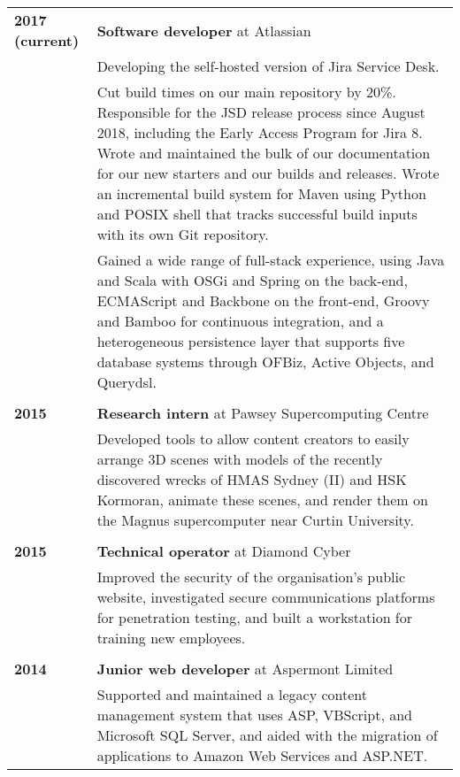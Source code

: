 \documentclass[a4paper,12pt]{article}
\begin{document}
\begin{tabular}{p{35mm}p{125mm}}
	                    \textbf{2017 (current)}     & \textbf{Software developer} at Atlassian
	\vspace{0.2em}  \\                              & Developing the self-hosted version of Jira Service Desk.
	\vspace{0.2em}  \\                              & Cut build times on our main repository by 20\%. Responsible for the JSD release process since August 2018, including the Early Access Program for Jira 8. Wrote and maintained the bulk of our documentation for our new starters and our builds and releases. Wrote an incremental build system for Maven using Python and POSIX shell that tracks successful build inputs with its own Git repository.
	\vspace{0.2em}  \\                              & Gained a wide range of full-stack experience, using Java and Scala with OSGi and Spring on the back-end, ECMAScript and Backbone on the front-end, Groovy and Bamboo for continuous integration, and a heterogeneous persistence layer that supports five database systems through OFBiz, Active Objects, and Querydsl.
	\\              \\  \textbf{2015}               & \textbf{Research intern} at Pawsey Supercomputing Centre
	\vspace{0.2em}  \\                              & Developed tools to allow content creators to easily arrange 3D scenes with models of the recently discovered wrecks of HMAS Sydney (II) and HSK Kormoran, animate these scenes, and render them on the Magnus supercomputer near Curtin University.
	\\              \\  \textbf{2015}               & \textbf{Technical operator} at Diamond Cyber
	\vspace{0.2em}  \\                              & Improved the security of the organisation's public website, investigated secure communications platforms for penetration testing, and built a workstation for training new employees.
	\\              \\  \textbf{2014}               & \textbf{Junior web developer} at Aspermont Limited
	\vspace{0.2em}  \\                              & Supported and maintained a legacy content management system that uses ASP, VBScript, and Microsoft SQL Server, and aided with the migration of applications to Amazon Web Services and ASP.NET.

\end{tabular}
\end{document}

